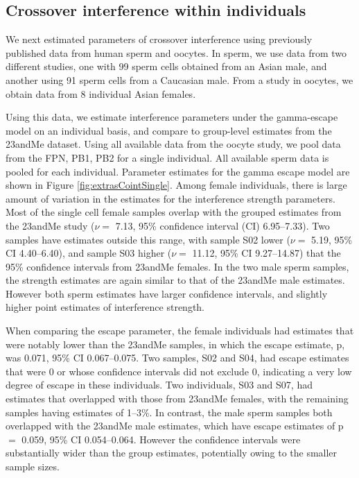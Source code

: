 \subsection{Crossover interference within individuals}
We next estimated parameters of crossover interference using previously published data from human sperm and oocytes.
In sperm, we use data from two different studies, one with 99 sperm cells obtained from an Asian male\cite{Lu2012}, and another using 91 sperm cells from a Caucasian male\cite{Wang2012}.
From a study in oocytes, we obtain data from 8 individual Asian females\cite{Hou2013}.

Using this data, we estimate interference parameters under the gamma-escape model on an individual basis, and compare to group-level estimates from the 23andMe dataset\cite{Campbell2015}.
Using all available data from the oocyte study, we pool data from the FPN, PB1, PB2 for a single individual.
All available sperm data is pooled for each individual.
Parameter estimates for the gamma escape model are shown in Figure \ref{fig:extrasCointSingle}.
Among female individuals, there is large amount of variation in the estimates for the interference strength parameters.
Most of the single cell female samples overlap with the grouped estimates from the 23andMe study ($\nu=$ 7.13, 95\% confidence interval (CI) 6.95--7.33).
Two samples have estimates outside this range, with sample S02 lower ($\nu=$ 5.19, 95\% CI 4.40--6.40), and sample S03 higher ($\nu=$ 11.12, 95\% CI 9.27--14.87) that the 95\% confidence intervals from 23andMe females.
In the two male sperm samples, the strength estimates are again similar to that of the 23andMe male estimates.
However both sperm estimates have larger confidence intervals, and slightly higher point estimates of interference strength.

When comparing the escape parameter, the female individuals had estimates that were notably lower than the 23andMe samples, in which the escape estimate, p, was 0.071, 95\% CI 0.067--0.075.
Two samples, S02 and S04, had escape estimates that were 0 or whose confidence intervals did not exclude 0, indicating a very low degree of escape in these individuals.
Two individuals, S03 and S07, had estimates that overlapped with those from 23andMe females, with the remaining samples having estimates of 1--3\%.
In contrast, the male sperm samples both overlapped with the 23andMe male estimates, which have escape estimates of p$=$ 0.059, 95\% CI 0.054--0.064.
However the confidence intervals were substantially wider than the group estimates, potentially owing to the smaller sample sizes.

